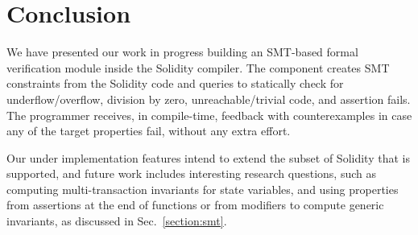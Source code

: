 \section{Conclusion}
\label{section:conclusion}
We have presented our work in progress building an SMT-based formal
verification module inside the Solidity compiler.
%
The component creates SMT constraints from the Solidity code and queries to
statically check for underflow/overflow, division by zero, unreachable/trivial
code, and assertion fails.
%
The programmer receives, in compile-time, feedback with counterexamples in case
any of the target properties fail, without any extra effort.

Our under implementation features intend to extend the subset of Solidity that
is supported, and future work includes interesting research questions, such as
computing multi-transaction invariants for state variables, and using
properties from assertions at the end of functions or from modifiers to compute
generic invariants, as discussed in Sec.~\ref{section:smt}.
